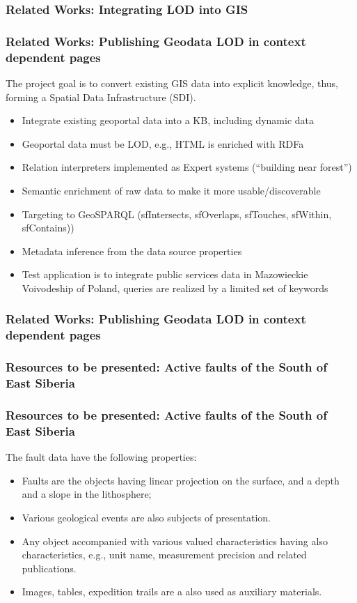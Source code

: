 \documentclass[10pt]{beamer}
\begin{document}
\begin{frame}
  \frametitle{Related Works: Integrating LOD into GIS}
\end{frame}


\begin{frame}
  \frametitle{Related Works: Publishing Geodata LOD in context dependent pages}
  The project \cite{iwaniak17} goal is to convert existing GIS data into explicit knowledge, thus, forming a Spatial Data Infrastructure (SDI).
  \begin{itemize}
  \item Integrate existing geoportal data into a KB, including dynamic data
  \item Geoportal data must be LOD, e.g., HTML is enriched with RDFa
  \item Relation interpreters implemented as Expert systems (``building near forest'')
  \item Semantic enrichment of raw data to make it more usable/discoverable
  \item Targeting to GeoSPARQL (sfIntersects, sfOverlaps, sfTouches, sfWithin, sfContains))
  \item Metadata inference from the data source properties
  \item Test application is to integrate public services data in Mazowieckie Voivodeship of Poland, queries are realized by a limited set of keywords
  \end{itemize}

\end{frame}

\begin{frame}
  \frametitle{Related Works: Publishing Geodata LOD in context dependent pages}
\end{frame}


\begin{frame}
  \frametitle{Resources to be presented: Active faults of the South of
    East Siberia}
\end{frame}

\begin{frame}
  \frametitle{Resources to be presented: Active faults of the South of
    East Siberia}
  The fault data have the following properties:
  \begin{itemize}
  \item Faults are the objects having linear projection on the surface, and a depth and a slope in the lithosphere;
  \item Various geological events are also subjects of presentation.
  \item Any object accompanied with various valued characteristics having also characteristics, e.g., unit name, measurement precision and related publications.
  \item Images, tables, expedition trails are a also used as auxiliary materials.
  \end{itemize}
\end{frame}
\end{document}
